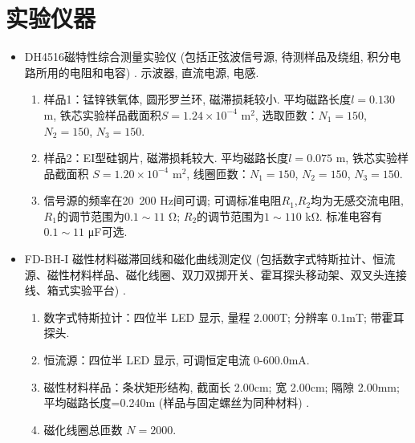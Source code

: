 \documentclass[zihao=5, UTF8]{article}
\theoremstyle{MyLineTheoremStyle} %
\theoremstyle{MyBlockTheoremStyle} %
\theoremstyle{MySubsubsectionStyle} %
\begin{document}
\section{实验仪器}
\begin{itemize}
    \item DH4516磁特性综合测量实验仪 (包括正弦波信号源, 待测样品及绕组, 积分电路所用的电阻和电容) . 示波器, 直流电源, 电感. 
    \begin{enumerate}
        \item  样品1：锰锌铁氧体, 圆形罗兰环, 磁滞损耗较小. 平均磁路长度$l = 0.130$ m, 铁芯实验样品截面积$S = 1.24 \times 10^{-4}$ m$^2$, 选取匝数：$N_1 = 150$, $N_2 = 150$, $N_3 = 150$. 
        \item  样品2：EI型硅钢片, 磁滞损耗较大. 平均磁路长度$l = 0.075$ m, 铁芯实验样品截面积 $S = 1.20 \times 10^{-4}$ m$^2$, 线圈匝数：$N_1 = 150$, $N_2 = 150$, $N_3 = 150$. 
        \item  信号源的频率在20~200 Hz间可调; 可调标准电阻$R_1$,$R_2$均为无感交流电阻, $R_1$的调节范围为$0.1 \sim 11$ Ω; $R_2$的调节范围为$1 \sim 110$ kΩ.  标准电容有$0.1 \sim 11$ μF可选. 
    \end{enumerate}
    \item FD-BH-I 磁性材料磁滞回线和磁化曲线测定仪 (包括数字式特斯拉计、恒流源、磁性材料样品、磁化线圈、双刀双掷开关、霍耳探头移动架、双叉头连接线、箱式实验平台) . 
    
    \begin{enumerate}
        \item  数字式特斯拉计：四位半 LED 显示, 量程 2.000T; 分辨率 0.1mT; 带霍耳探头. 
        \item  恒流源：四位半 LED 显示, 可调恒定电流 0-600.0mA. 
        \item  磁性材料样品：条状矩形结构, 截面长 2.00cm; 宽 2.00cm; 隔隙 2.00mm; 平均磁路长度=0.240m (样品与固定螺丝为同种材料) . 
        \item  磁化线圈总匝数 $N=2000$. 
    \end{enumerate}
\end{itemize}
\end{document}
